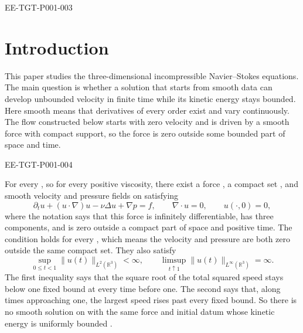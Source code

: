 \begin{EESegment}{EE-TGT-P001-003}
\section{Introduction}\label{sec:1}

This paper studies the three-dimensional incompressible Navier--Stokes equations. The main
question is whether a solution that starts from smooth data can develop unbounded velocity in
finite time while its kinetic energy stays bounded. Here smooth means that derivatives of every
order exist and vary continuously. The flow constructed below starts with zero velocity and is
driven by a smooth force with compact support, so the force is zero outside some bounded part of
space and time.
\end{EESegment}

\begin{EESegment}{EE-TGT-P001-004}
\begin{theorem}\label{thm:1.1}
For every , so for every positive viscosity, there exist a force
, a compact set
, and smooth velocity and pressure fields
 on \NSi{NS-F-P001-005}{\mathbb R^3\times[0,1)} satisfying
\begin{equation}
  \partial_tu+(u\cdot\nabla)u-\nu\Delta u+\nabla p=f,
  \qquad \nabla\cdot u=0,
  \qquad u(\cdot,0)=0,
  \tag{1.1}\label{eq:1.1}
\end{equation}
where the notation says that this force is infinitely differentiable, has three components, and
is zero outside a compact part of space and positive time. The condition
 holds for every
, which means the velocity and pressure are both zero outside the
same compact set. They also satisfy
\begin{equation*}
  \sup_{0\leq t<1}\lVert u(t)\rVert_{L^2(\mathbb R^3)}<\infty,
  \qquad
  \limsup_{t\uparrow1}\lVert u(t)\rVert_{L^\infty(\mathbb R^3)}=\infty.
\end{equation*}
The first inequality says that the square root of the total squared speed stays below one fixed
bound at every time before one. The second says that, along times approaching one, the largest
speed rises past every fixed bound. So there is no smooth solution
 on
\NSi{NS-F-P001-011}{\mathbb R^3\times[0,\infty)} with the same force and initial
datum whose kinetic energy is uniformly bounded
.
\end{theorem}
\end{EESegment}

